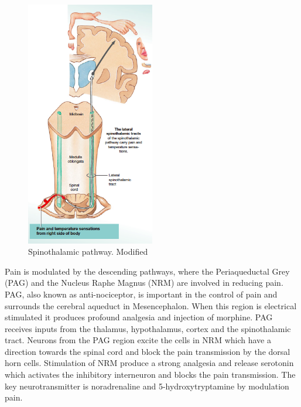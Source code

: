 \begin{figure}[H]
	\includegraphics[width=0.5\textwidth]{figures/pathways.png} 
	\caption{Spinothalamic pathway. Modified~\cite{Martini2012}}
	\label{fig:pathways}  
\end{figure}   

Pain is modulated by the descending pathways, where the Periaqueductal Grey (PAG) and the Nucleus Raphe Magnus (NRM) are involved in reducing pain. PAG, also known as anti-nociceptor, is important in the control of pain and surrounds the cerebral aqueduct in Mesencephalon. When this region is electrical stimulated it produces profound analgesia and injection of morphine. PAG receives inputs from the thalamus, hypothalamus, cortex and the spinothalamic tract. Neurons from the PAG region excite the cells in NRM which have a direction towards the spinal cord and block the pain transmission by the dorsal horn cells. Stimulation of NRM produce a strong analgesia and release serotonin which activates the inhibitory interneuron and blocks the pain transmission. The key neurotransmitter is noradrenaline and 5-hydroxytryptamine by modulation pain.~\cite{Steeds2013}
